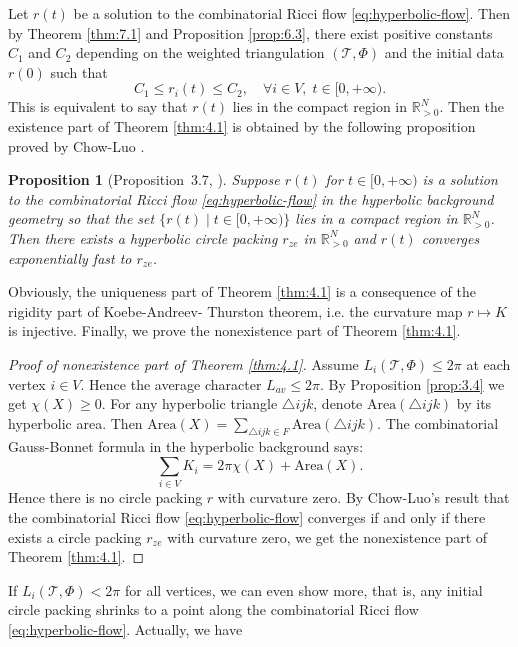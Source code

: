 \documentclass[12pt]{amsart}
\numberwithin{equation}{section}
\newtheorem{prop}{Proposition}[section]
\begin{document}
Let $r(t)$ be a solution to the combinatorial Ricci flow \eqref{eq:hyperbolic-flow}. Then by Theorem \ref{thm:7.1} and Proposition \ref{prop:6.3},
there exist positive constants $C_1$ and $C_2$ depending on the weighted triangulation $(\mathcal{T},\Phi)$ and the initial
data $r(0)$ such that
\[
C_1 \leq r_i(t) \leq C_2, \quad \forall i \in V, \; t \in [0,+\infty).
\]
This is equivalent to say that $r(t)$ lies in the compact region in $\mathbb{R}^N_{>0}$. Then the existence part of Theorem
\ref{thm:4.1} is obtained by the following proposition proved by Chow-Luo \cite{ChowLuo}.

\begin{prop}[Proposition~3.7, \cite{ChowLuo}]\label{prop:7.2}
Suppose $r(t)$ for $t \in [0,+\infty)$ is a solution to the combinatorial
Ricci flow \eqref{eq:hyperbolic-flow} in the hyperbolic background geometry so that the set $\{r(t) \mid t \in [0,+\infty)\}$ lies in a compact
region in $\mathbb{R}^N_{>0}$. Then there exists a hyperbolic circle packing $r_{ze}$ in $\mathbb{R}^N_{>0}$ and $r(t)$ converges exponentially
fast to $r_{ze}$.
\end{prop}

Obviously, the uniqueness part of Theorem \ref{thm:4.1} is a consequence of the rigidity part of Koebe-Andreev-
Thurston theorem, i.e. the curvature map $r \mapsto K$ is injective. Finally, we prove the nonexistence part of
Theorem \ref{thm:4.1}.

\begin{proof}[Proof of nonexistence part of Theorem \ref{thm:4.1}]
Assume $L_i(\mathcal{T},\Phi) \leq 2\pi$ at each vertex $i \in V$. Hence the average character $L_{av} \leq 2\pi$. By
Proposition \ref{prop:3.4} we get $\chi(X) \geq 0$. For any hyperbolic triangle $\triangle ijk$, denote $\mathrm{Area}(\triangle ijk)$ by its hyperbolic
area. Then $\mathrm{Area}(X) = \sum_{\triangle ijk \in F} \mathrm{Area}(\triangle ijk)$. The combinatorial Gauss-Bonnet formula \cite{ChowLuo} in the
hyperbolic background says:
\[
\sum_{i \in V} K_i = 2\pi\chi(X) + \mathrm{Area}(X).
\]
Hence there is no circle packing $r$ with curvature zero. By Chow-Luo's result \cite{ChowLuo} that the combinatorial
Ricci flow \eqref{eq:hyperbolic-flow} converges if and only if there exists a circle packing $r_{ze}$ with curvature zero, we get the
nonexistence part of Theorem \ref{thm:4.1}.
\end{proof}

If $L_i(\mathcal{T},\Phi) < 2\pi$ for all vertices, we can even show more, that is, any initial circle packing shrinks to
a point along the combinatorial Ricci flow \eqref{eq:hyperbolic-flow}. Actually, we have
\end{document}
